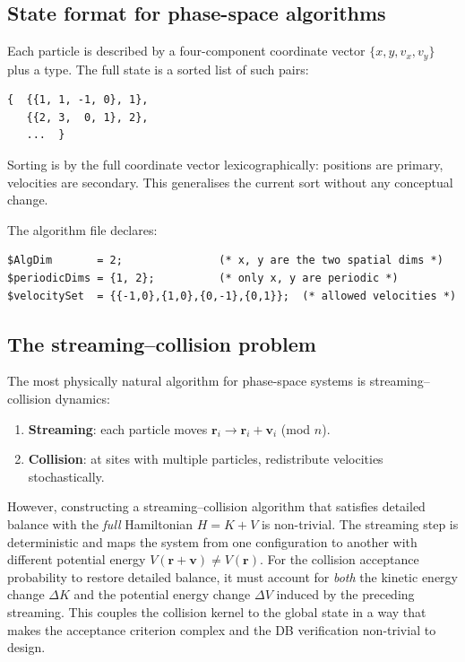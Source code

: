 \documentclass[12pt,a4paper]{article}
\begin{document}
\subsection{State format for phase-space algorithms}

Each particle is described by a four-component coordinate vector $\{x, y, v_x,
v_y\}$ plus a type.  The full state is a sorted list of such pairs:
\begin{lstlisting}
{  {{1, 1, -1, 0}, 1},
   {{2, 3,  0, 1}, 2},
   ...  }
\end{lstlisting}
Sorting is by the full coordinate vector lexicographically: positions are
primary, velocities are secondary.  This generalises the current sort without
any conceptual change.

The algorithm file declares:
\begin{lstlisting}
$AlgDim       = 2;               (* x, y are the two spatial dims *)
$periodicDims = {1, 2};          (* only x, y are periodic *)
$velocitySet  = {{-1,0},{1,0},{0,-1},{0,1}};  (* allowed velocities *)
\end{lstlisting}

\subsection{The streaming--collision problem}
\label{sec:streamcol}

The most physically natural algorithm for phase-space systems is
streaming--collision dynamics:
\begin{enumerate}
  \item \textbf{Streaming}: each particle moves $\mathbf{r}_i \to \mathbf{r}_i
    + \mathbf{v}_i$ (mod $n$).
  \item \textbf{Collision}: at sites with multiple particles, redistribute
    velocities stochastically.
\end{enumerate}

However, constructing a streaming--collision algorithm that satisfies detailed
balance with the \emph{full} Hamiltonian $H = K + V$ is non-trivial.  The
streaming step is deterministic and maps the system from one configuration to
another with different potential energy $V(\mathbf{r} + \mathbf{v}) \neq
V(\mathbf{r})$.  For the collision acceptance probability to restore detailed
balance, it must account for \emph{both} the kinetic energy change $\Delta K$
and the potential energy change $\Delta V$ induced by the preceding streaming.
This couples the collision kernel to the global state in a way that makes the
acceptance criterion complex and the DB verification non-trivial to design.
\end{document}
